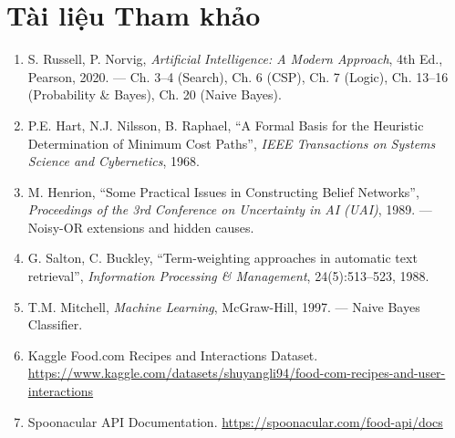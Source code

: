 
\section*{Tài liệu Tham khảo}

\begin{enumerate}
  \item S. Russell, P. Norvig, \textit{Artificial Intelligence: A Modern Approach}, 4th Ed., Pearson, 2020. --- Ch. 3--4 (Search), Ch. 6 (CSP), Ch. 7 (Logic), Ch. 13--16 (Probability \& Bayes), Ch. 20 (Naive Bayes).

  \item P.E. Hart, N.J. Nilsson, B. Raphael, ``A Formal Basis for the Heuristic Determination of Minimum Cost Paths'', \textit{IEEE Transactions on Systems Science and Cybernetics}, 1968.

  \item M. Henrion, ``Some Practical Issues in Constructing Belief Networks'', \textit{Proceedings of the 3rd Conference on Uncertainty in AI (UAI)}, 1989. --- Noisy-OR extensions and hidden causes.

  \item G. Salton, C. Buckley, ``Term-weighting approaches in automatic text retrieval'', \textit{Information Processing \& Management}, 24(5):513--523, 1988.

  \item T.M. Mitchell, \textit{Machine Learning}, McGraw-Hill, 1997. --- Naive Bayes Classifier.

  \item Kaggle Food.com Recipes and Interactions Dataset. \url{https://www.kaggle.com/datasets/shuyangli94/food-com-recipes-and-user-interactions}

  \item Spoonacular API Documentation. \url{https://spoonacular.com/food-api/docs}
\end{enumerate}

